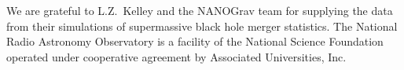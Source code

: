 \documentclass[twocolumn]{aastex631}
\begin{document}
\begin{acknowledgments}
We are grateful to L.Z.\ Kelley and the NANOGrav team for supplying the data from their simulations of supermassive black hole merger statistics. 
The National Radio Astronomy Observatory is a facility of the National Science Foundation operated under cooperative agreement by Associated Universities, Inc.
\end{acknowledgments}

{}

\end{document}
